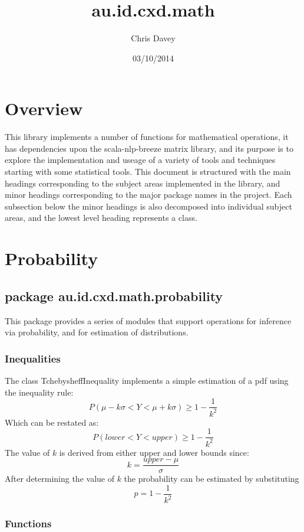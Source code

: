 \documentclass[a4paper]{article}
\title{au.id.cxd.math}
\date{03/10/2014}
\author{Chris Davey}
\begin{document}
\section{Overview}

This library implements a number of functions for mathematical operations, it has dependencies upon the scala-nlp-breeze matrix library, and its purpose is to explore the implementation and useage of a variety of tools and techniques starting with some statistical tools.
This document is structured with the main headings corresponding to the subject areas implemented in the library, and minor headings corresponding to the major package names in the project. Each subsection below the minor headings is also decomposed into individual subject areas, and the lowest level heading represents a class.




\section{Probability}

\subsection{package au.id.cxd.math.probability}

This package provides a series of modules that support operations for inference via probability, and for estimation of distributions.

\subsubsection{Inequalities}

The class TchebysheffInequality implements a simple estimation of a pdf using the inequality rule:\\
$$
P(\mu - k\sigma < Y < \mu + k\sigma) \ge 1 - \frac{1}{k^2}
$$
Which can be restated as:
$$
P(lower < Y < upper) \ge 1 - \frac{1}{k^2}
$$
The value of $k$ is derived from either upper and lower bounds since:
$$
k = \frac{upper - \mu} {\sigma}
$$
After determining the value of $k$ the probability can be estimated by substituting
$$
p = 1 - \frac{1}{k^2}
$$






\subsubsection{Functions}
\end{document}
